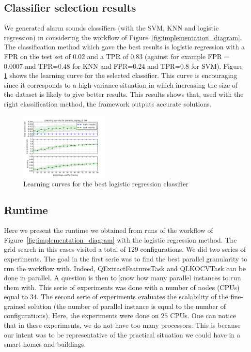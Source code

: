 \documentclass[10pt, conference, compsocconf]{IEEEtran}
\begin{document}
\subsection{Classifier selection results}
We generated alarm sounds classifiers (with the SVM, KNN and logistic regression) in considering the workflow of 
Figure~\ref{fig:implementation_diagram}. 
The classification method which gave the best results is logistic regression with a FPR on the test set of $0.02$ and a TPR of $0.83$ (against for example FPR = $0.0007$ and TPR=$0.48$ for KNN and FPR=$0.24$ and TPR=$0.8$ for SVM). Figure \ref{fig:learning_curve} shows the learning curve for the selected classifier. This curve is encouraging since it corresponds to a high-variance situation in which increasing the size of the dataset is likely to give better results. This results shows that, used with the right classification method, the framework outputs accurate solutions. 
\begin{figure}[h]
  \centering
  \includegraphics[width=0.4\textwidth]{Figures/learning_curve_logreg0_newdata.png}
  \caption{Learning curves for the best logistic regression classifier \label{fig:learning_curve}}
\end{figure}

\subsection{Runtime}
Here we present the runtime we obtained from runs of the workflow of Figure~\ref{fig:implementation_diagram} with the logistic 
regression method. The grid search in this cases visited a total of $129$ configurations. We did two series of experiments. 
The goal in the first serie was to find the best parallel granularity to run the workflow with. Indeed, 
QExtractFeaturesTask and QLKOCVTask can be done in parallel. A question is then to know how 
many parallel instances to run them with. This serie of experiments was done with a number of nodes (CPUs) equal to $34$. 
The second serie of experiments evaluates the scalability of the fine-grained solution (the number of parallel instance is equal to the 
number of configurations). Here, the experiments were done on $25$ CPUs.
One can notice that in these experiments, we do not have too many processors. This is because our intent was to be representative 
of the practical situation we could have in a smart-homes and buildings.   
\end{document}
